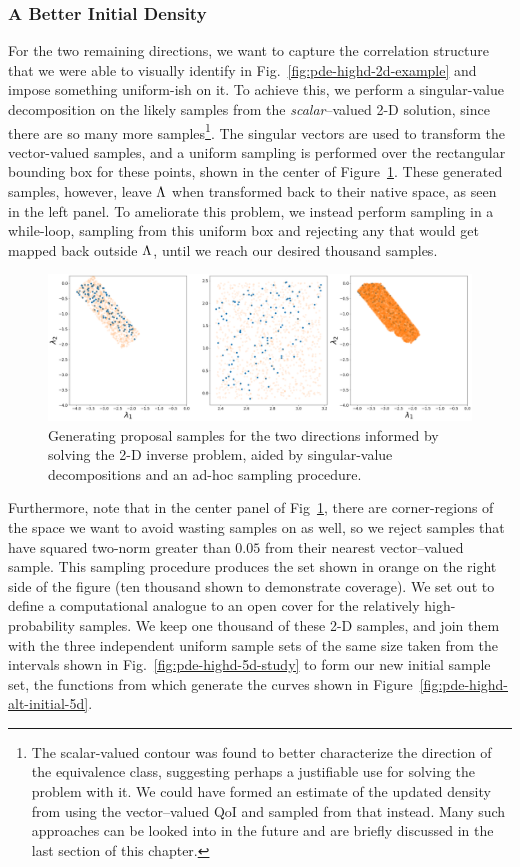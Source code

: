 \subsubsection{A Better Initial Density}
For the two remaining directions, we want to capture the correlation structure that we were able to visually identify in Fig.~\ref{fig:pde-highd-2d-example} and impose something uniform-ish on it.
To achieve this, we perform a singular-value decomposition on the likely samples from the \emph{scalar}--valued 2-D solution, since there are so many more samples\footnote{ The scalar-valued contour was found to better characterize the direction of the equivalence class, suggesting perhaps a justifiable use for solving the problem with it. We could have formed an estimate of the updated density from using the vector--valued QoI and sampled from that instead. Many such approaches can be looked into in the future and are briefly discussed in the last section of this chapter.}.
The singular vectors are used to transform the vector-valued samples, and a uniform sampling is performed over the rectangular bounding box for these points, shown in the center of Figure~\ref{fig:pde-highd-2d-study}.
These generated samples, however, leave ${\Lambda}$ when transformed back to their native space, as seen in the left panel.
To ameliorate this problem, we instead perform sampling in a while-loop, sampling from this uniform box and rejecting any that would get mapped back outside ${\Lambda}$, until we reach our desired thousand samples.


\begin{figure}[htbp]
\centering
  \includegraphics[width=0.95\linewidth]{figures/pde-highd/pde-highd-alt_initial_D2_m100}
\caption{
Generating proposal samples for the two directions informed by solving the 2-D inverse problem, aided by singular-value decompositions and an ad-hoc sampling procedure.
}
\label{fig:pde-highd-2d-study}
\end{figure}

Furthermore, note that in the center panel of Fig~\ref{fig:pde-highd-2d-study}, there are corner-regions of the space we want to avoid wasting samples on as well, so we reject samples that have squared two-norm greater than $0.05$ from their nearest vector--valued sample.
This sampling procedure produces the set shown in orange on the right side of the figure (ten thousand shown to demonstrate coverage).
We set out to define a computational analogue to an open cover for the relatively high-probability samples.
We keep one thousand of these 2-D samples, and join them with the three independent uniform sample sets of the same size taken from the intervals shown in Fig.~\ref{fig:pde-highd-5d-study} to form our new initial sample set, the functions from which generate the curves shown in Figure~\ref{fig:pde-highd-alt-initial-5d}.

